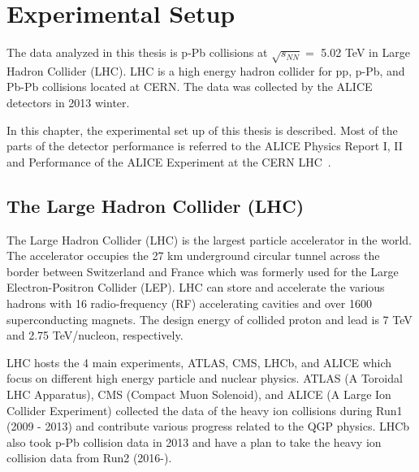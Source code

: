 \chapter{Experimental Setup}
\label{chap_setup}
The data analyzed in this thesis is p-Pb collisions at $\sqrt{s_{NN}}=$ 5.02 TeV in Large Hadron Collider (LHC).
LHC is a high energy hadron collider for pp, p-Pb, and Pb-Pb collisions located at CERN. 
The data was collected by the ALICE detectors in 2013 winter. 

In this chapter, the experimental set up of this thesis is described. 
Most of the parts of the detector performance is referred to the ALICE Physics Report I, II and Performance of the ALICE Experiment at the CERN LHC~\cite{bib_aprv1,bib_aprv2,bib_aprrun1}. 


\section{The Large Hadron Collider (LHC)}
\label{sec_3_LHC}
The Large Hadron Collider (LHC) is the largest particle accelerator in the world. 
The accelerator occupies the 27 km underground circular tunnel across the border between Switzerland and France which was formerly used for the Large Electron-Positron Collider (LEP). 
LHC can store and accelerate the various hadrons with 16 radio-frequency (RF) accelerating cavities and over 1600 superconducting magnets. 
The design energy of collided proton and lead is 7 TeV and 2.75 TeV/nucleon, respectively.

LHC hosts the 4 main experiments, ATLAS, CMS, LHCb, and ALICE which focus on different high energy particle and nuclear physics. 
ATLAS (A Toroidal LHC Apparatus), CMS (Compact Muon Solenoid), and ALICE (A Large Ion Collider Experiment) collected the data of the heavy ion collisions during Run1 (2009 - 2013) and contribute various progress related to the QGP physics. 
LHCb also took p-Pb collision data in 2013 and have a plan to take the heavy ion collision data from Run2 (2016-).

